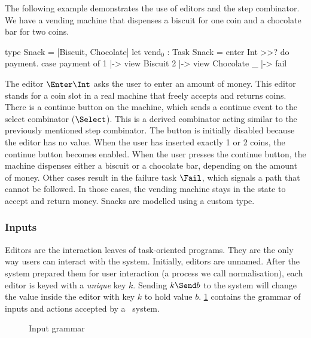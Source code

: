 \begin{example}
  \label{exm:vending-base}
  The following example demonstrates the use of editors and the step combinator.
  We have a vending machine that dispenses a biscuit for one coin and a chocolate bar for two coins.
  \begin{TASK}[emph={payment}]
    type Snack = [Biscuit, Chocolate]
    let vend$_0$ : Task Snack = enter Int >>? do payment.
      case payment of
        1 |-> view Biscuit
        2 |-> view Chocolate
        _ |-> fail
  \end{TASK}
  The editor $\Enter \Int$ asks the user to enter an amount of money.
  This editor stands for a coin slot in a real machine that freely accepts and returns coins.
  There is a continue button on the machine, which sends a continue event to the select combinator ($\Select$).
  This is a derived combinator acting similar to the previously mentioned step combinator.
  The button is initially disabled because the editor has no value.
  When the user has inserted exactly 1 or 2 coins, the continue button becomes enabled.
  When the user presses the continue button, the machine dispenses either a biscuit or a chocolate bar, depending on the amount of money.
  Other cases result in the failure task $\Fail$, which signals a path that cannot be followed.
  In those cases, the vending machine stays in the state to accept and return money.
  Snacks are modelled using a custom type.
\end{example}


\subsubsection{Inputs}

Editors are the interaction leaves of task-oriented programs.
They are the only way users can interact with the system.
Initially, editors are unnamed.
After the system prepared them for user interaction (a process we call normalisation),
each editor is keyed with a \emph{unique} key $k$.
Sending $k \Send b$ to the system will change the value inside the editor with key $k$ to hold value $b$.
\cref{fig:input-grammar} contains the grammar of inputs and actions accepted by a \TOPHAT\ system.

\begin{figure}
  \caption{Input grammar}
  \label{fig:input-grammar}
\end{figure}


